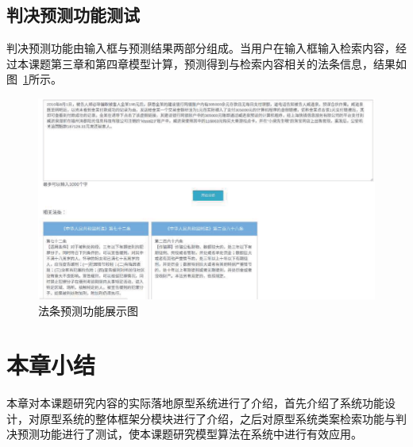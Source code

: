 \subsection{判决预测功能测试}
判决预测功能由输入框与预测结果两部分组成。当用户在输入框输入检索内容，经过本课题第三章和第四章模型计算，预测得到与检索内容相关的法条信息，结果如图~\ref{fig:sys_article}所示。
\begin{figure}[htbp]%
    \centering
    \includegraphics[scale=0.35, clip=true]{./sources/sys_article.eps}
    \caption{\label{fig:sys_article}法条预测功能展示图}
\end{figure}

\section{本章小结}
本章对本课题研究内容的实际落地原型系统进行了介绍，首先介绍了系统功能设计，对原型系统的整体框架分模块进行了介绍，之后对原型系统类案检索功能与判决预测功能进行了测试，使本课题研究模型算法在系统中进行有效应用。
